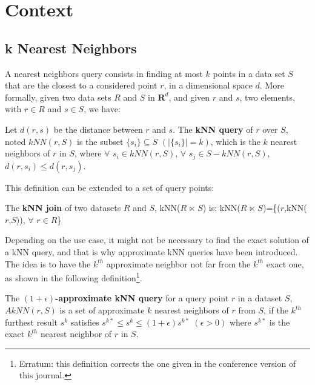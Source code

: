 \section{Context}
\subsection{k Nearest Neighbors}
A nearest neighbors query consists in finding at most $k$ points in a data set $S$ that are the closest to a considered point $r$, in a dimensional space $d$. More formally, 
given two data sets $R$ and $S$ in $\mathbf{R}^d$, and given $r$ and $s$, two elements, with $r \in R$ and $s \in S$, we have:
%
\begin{myDef}
	Let $d(r,s)$ be the distance between $r$ and $s$. The \textbf{kNN query} of $r$ over $S$, noted $kNN(r,S)$ is the subset $\{s_i\} \subseteq S$ $\left(\left|\{s_i\}\right| = k\right)$, which is the $k$ nearest neighbors of $r$ in $S$, where $\forall$ $s_i \in kNN(r,S)$, $\forall$ $s_j \in S-kNN(r,S)$, $d(r,s_i) \leq d(r,s_j)$.
\end{myDef}
This definition can be extended to a set of query points:
\begin{myDef}
	The \textbf{kNN join} of two datasets $R$ and $S$, kNN($R$ $\ltimes$ $S$) is:
	kNN($R$ $\ltimes$ $S$)=\{($r$,kNN($r$,$S$)), $\forall$ $r \in R$\}	
\end{myDef}
Depending on the use case, it might not be necessary to find the exact solution of a kNN query, and that is why approximate kNN queries have been introduced. The idea is to have the $k^{th}$ approximate neighbor not far from the $k^{th}$ exact one, as shown in the following definition\footnote{Erratum: this definition corrects the one given in the conference version of this journal.}. 
\begin{myDef}
    The \textbf{$\left(1+\epsilon\right)$-approximate kNN query} for a query point $r$ in a dataset $S$, $AkNN(r,S)$ is a set of approximate $k$ nearest neighbors of $r$ from $S$, if the $k^{th}$ furthest result $s^{k}$ satisfies $s^{k*} \leq s^{k} \leq (1+\epsilon)s^{k*} $ $(\epsilon > 0)$ where $s^{k*}$ is the exact $k^{th}$ nearest neighbor of $r$ in $S$.
\end{myDef}

